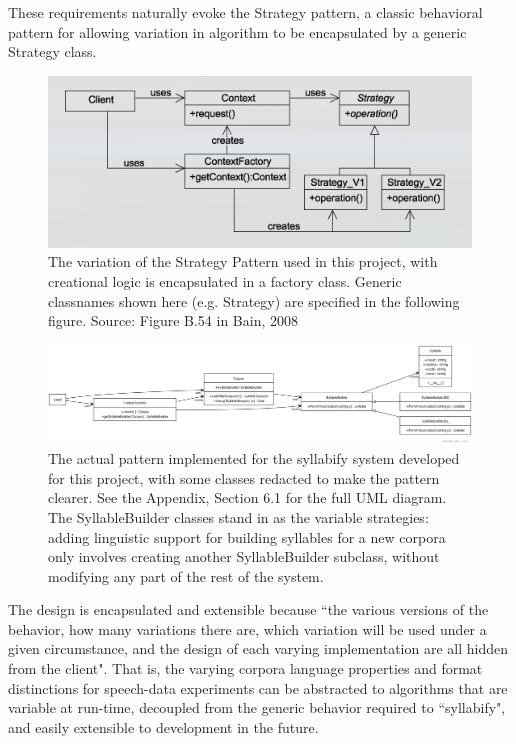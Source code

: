 \documentclass[11pt]{article}
\begin{document}
These requirements naturally evoke the Strategy pattern\cite{freeman_head_2004}, a classic behavioral pattern for allowing variation in algorithm to be encapsulated by a generic Strategy class.

\begin{figure}[h]
\centering
\includegraphics[scale=0.5]{strategy-pattern.png}
\caption{The variation of the Strategy Pattern used in this project, with creational logic is encapsulated in a factory class. Generic classnames shown here (e.g. Strategy) are specified in the following figure. Source: Figure B.54 in Bain, 2008\cite{bain_emergent_2008}}
\label{fig:strategy-pattern}
\end{figure}

\begin{figure}[h]
  \centering
  \includegraphics[scale=0.25]{syllabify-pattern.png}
  \caption{The actual pattern implemented for the syllabify system developed for this project, with some classes redacted to make the pattern clearer. See the Appendix, Section 6.1 for the full UML diagram. The SyllableBuilder classes stand in as the variable strategies: adding linguistic support for building syllables for a new corpora only involves creating another SyllableBuilder subclass, without modifying any part of the rest of the system.}
  \label{fig:syllabify-pattern}
\end{figure}

The design is encapsulated and extensible because ``the various versions of the behavior, how many variations there are, which variation will be used under a given circumstance, and the design of each varying implementation are all hidden from the client"\cite{bain_emergent_2008}. That is, the varying corpora language properties and format distinctions for speech-data experiments can be abstracted to algorithms that are variable at run-time, decoupled from the generic behavior required to ``syllabify", and easily extensible to development in the future.
\end{document}
